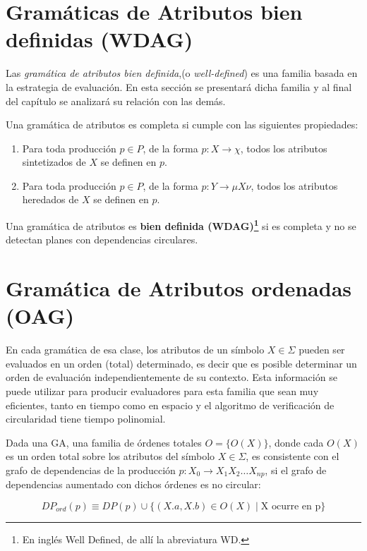 \section{Gramáticas de Atributos bien definidas (WDAG)}
\label{sec:well-defined}

Las \textit{gramática de atributos bien definida},(o \textit{well-defined}) es una familia basada en la estrategia de evaluación. En esta sección se presentará dicha familia y al final del capítulo se analizará su relación con las demás. 

\begin{definition} \label{def:gacompleta}Una gramática de atributos es completa si cumple con las siguientes propiedades:
\begin{enumerate}
\item Para toda producción $p \in P$, de la forma $p:X \rightarrow \chi$, todos los atributos sintetizados de $X$ se definen en $p$.
\item Para toda producción $p \in P$, de la forma $p:Y \rightarrow \mu X \nu$, todos los atributos heredados de $X$ se definen en $p$.
\end{enumerate}
\end{definition}

\begin{definition} 
Una gramática de atributos es \textbf{bien definida (WDAG)\footnote{En inglés Well Defined, de allí la abreviatura WD.}} si es completa y no se detectan planes con dependencias circulares.
\end{definition}

\section{Gramática de Atributos ordenadas (OAG)}
\label{sec:def-oag}
En cada gramática de esa clase, los atributos de un símbolo $X \in \Sigma$ pueden ser evaluados en un orden (total) determinado, es decir que es posible determinar un orden de evaluación independientemente de su contexto.
Esta información se puede utilizar para producir evaluadores para esta familia que sean muy eficientes, tanto en tiempo como en espacio y el algoritmo de verificación de circularidad tiene tiempo polinomial.

\begin{definition} Dada una GA, una familia de órdenes totales $O=\{O(X)\}$, donde cada $ O(X) $ es un orden total sobre los atributos del símbolo $ X \in \Sigma $, es consistente con el grafo de dependencias de la producción $p: X_0 \rightarrow X_1 X_2 \ldots X_{np}$, si el grafo de dependencias aumentado con dichos órdenes es no circular:

$$ DP_{ord}(p) \equiv DP(p) \cup \{ (X.a, X.b) \in O(X) \mid \textrm{X ocurre en p} \} $$
\end{definition}

